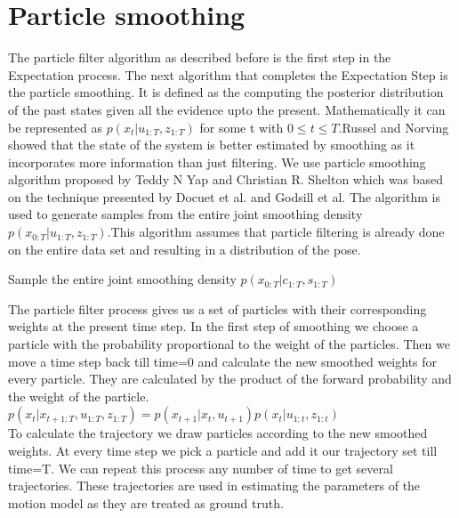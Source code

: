 \documentclass[12pt]{dalcsthesis}
\begin{document}
 \section{Particle smoothing}
The particle filter algorithm as described before is the first step in the Expectation process. The next algorithm that completes the Expectation Step is the particle smoothing. It is defined as the computing the posterior distribution of the past states given all the evidence upto the present.
Mathematically it can be represented as $p(x _{t}|u _{1:T},z _{1:T})$ for some t with $ 0 \leq t \leq T$.Russel and Norving showed that the state of the system is better estimated by smoothing as it incorporates more information than just filtering.
We use particle smoothing algorithm proposed by Teddy N Yap and Christian R. Shelton which was based on the technique presented by Docuet et al. and Godsill et al. The algorithm is used to generate samples from the entire joint smoothing density $p(x_{0:T}|u_{1:T},z_{1:T})$.This algorithm assumes that particle filtering is already done on the entire data set and resulting in a distribution of the pose.
\begin{algorithm}[H]
 \SetAlgoLined
  	\label{alg:Particle Smoothing}
	\caption{Sample the entire joint smoothing density $p(x_{0:T}|c_{1:T},s_{1:T})$}
	
\end{algorithm}

The particle filter process gives us a set of particles with their corresponding weights at the present time step. In the first step of smoothing we choose a particle with the probability proportional to the weight of the particles. Then we move a time step back till time=0 and calculate the new smoothed weights for every particle. They are calculated by the product of the forward probability and the weight of the particle. 
\\
$ p(x_{t}|x_{t+1:T},u_{1:T},z_{1:T})=p(x_{t+1}|x_{t},u_{t+1})p(x_{t}|u_{1:t},z_{1:t})$
\\
To calculate the trajectory we draw particles according to the new smoothed weights. At every time step we pick a particle and add it our trajectory set till time=T. We can repeat this process any number of time to get several trajectories. These trajectories are used in estimating the parameters of the motion model as they are treated as ground truth.
 
\end{document}
